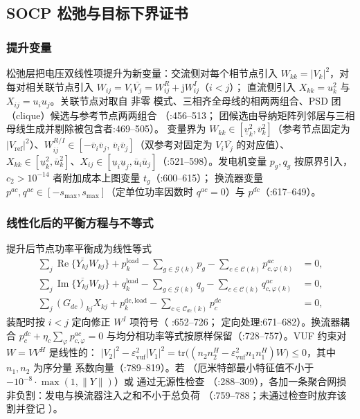 \subsection{SOCP 松弛与目标下界证书}\label{subsec:tp-relax}

\subsubsection*{提升变量}
松弛层把电压双线性项提升为新变量：交流侧对每个相节点引入
$W_{kk}=|V_k|^2$，对每对相关联节点引入
$W_{ij}=V_i\overline{V_j}=W^{R}_{ij}+\mathrm{j}W^{I}_{ij}$（$i<j$）；
直流侧引入 $X_{kk}=u_k^2$ 与 $X_{ij}=u_i u_j$。关联节点对取自  非零
模式、三相齐全母线的相两两组合、PSD 团（clique）候选与参考节点两两组合
（:456--513；
团候选由导纳矩阵列邻居与三相母线生成并剔除被包含者:469--505）。
变量界为 $W_{kk}\in[\underline{v}_k^2,\overline{v}_k^2]$（参考节点固定为
$|V_{\mathrm{ref}}|^2$）、$W^{R/I}_{ij}\in[-\overline{v}_i\overline{v}_j,\,
\overline{v}_i\overline{v}_j]$（双参考对固定为 $V_i\overline{V_j}$ 的对应值）、
$X_{kk}\in[\underline{u}_k^2,\overline{u}_k^2]$、$X_{ij}\in[\underline{u}_i
\underline{u}_j,\overline{u}_i\overline{u}_j]$（:521--598）。发电机变量
$p_g,q_g$ 按原界引入，$c_2>10^{-14}$ 者附加成本上图变量 $t_g$（:600--615）；
换流器变量 $p^{ac},q^{ac}\in[-s_{\max},s_{\max}]$（定单位功率因数时
$q^{ac}=0$）与 $p^{dc}$（:617--649）。

\subsubsection*{线性化后的平衡方程与不等式}
提升后节点功率平衡成为线性等式
\begin{align*}
\sum_{j}\operatorname{Re}\{\overline{Y_{kj}}W_{kj}\} + p^{\mathrm{load}}_k
  - \sum_{g\in\mathcal{G}(k)} p_g - \sum_{c\in\mathcal{C}(k)} p^{ac}_{c,\varphi(k)} &= 0,\\
\sum_{j}\operatorname{Im}\{\overline{Y_{kj}}W_{kj}\} + q^{\mathrm{load}}_k
  - \sum_{g\in\mathcal{G}(k)} q_g - \sum_{c\in\mathcal{C}(k)} q^{ac}_{c,\varphi(k)} &= 0,\\
\sum_{j} (G_{dc})_{kj}X_{kj} + p^{\mathrm{dc,load}}_k
  - \sum_{c\in\mathcal{C}_{dc}(k)} p^{dc}_c &= 0,
\end{align*}
装配时按 $i<j$ 定向修正 $W^{I}$ 项符号（
:652--726；
定向处理:671--682）。换流器耦合 $p^{dc}_c+\eta_c\sum_\varphi p^{ac}_{c,\varphi}=0$
与均分相功率等式按原样保留（:728--757）。VUF 约束对 $W=VV^{H}$ 是线性的：
$|V_2|^2-\varepsilon_{\mathrm{vuf}}^2|V_1|^2=\mathrm{tr}\bigl((n_2n_2^{H}-
\varepsilon_{\mathrm{vuf}}^2 n_1n_1^{H})W\bigr)\le 0$，其中 $n_1,n_2$ 为序分量
系数向量（:789--819）。若 （厄米特部最小特征值不小于
$-10^{-8}\cdot\max(1,\lVert Y\rVert)$）或  通过无源性检查
（:288--309），各加一条聚合网损非负割：发电与换流器注入之和不小于总负荷
（:759--788；未通过检查时放弃该割并登记 ）。

